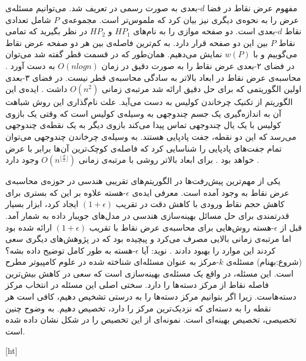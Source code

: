 مفهوم عرض نقاط در فضا $d$-بعدی به صورت رسمی در  تعریف شد. می‌توانیم مسئله‌ی عرض را به نحوه‌ی دیگری نیز بیان کرد که ملموس‌تر است.
 مجموعه‌ی $P$ شامل تعدادی نقاط $d$-بعدی است. دو صفحه موازی را به نام‌های $HP_1$ و $HP_2$ در نظر بگیرید که تمامی نقاط $P$ بین این دو صفحه قرار دارد. به کم‌ترین فاصله‌ی بین هر دو صفحه عرض نقاط می‌گوییم و با $w(P)$ نمایش می‌دهیم.
  همان‌طور که در قسمت قطر گفته شد می‌توان در فضای ۲-بعدی عرض نقاط را به صورت دقیق در زمان $O(n log n)$ به دست آورد . محاسبه‌ی عرض نقاط در ابعاد بالاتر به سادگی محاسبه‌ی قطر نیست. در فضای ۳-بعدی اولین الگوریتمی که برای حل دقیق ارائه شد مرتبه‌ی زمانی $O(n^2)$ داشت . ایده‌ی این الگوریتم از تکنیک چرخاندن کولیس  به دست می‌آید. علت نام‌گذاری این روش شباهت آن به اندازه‌گیری یک جسم چندوجهی به وسیله‌ی کولیس است که وقتی یک بازوی کولیس با یک یال چندوجهی تماس پیدا می‌کند بازوی دیگر به یک نقطه‌ی چندوجهی می‌رسد که این دو نقطه، جفت پادپایی  هستند. به وسیله‌ی چرخاندن چندوجهی می‌توان تمام جفت‌های پادپایی را شناسایی کرد که فاصله‌ی کوچک‌ترین آن‌ها برابر با عرض خواهد بود . برای ابعاد بالاتر روشی با مرتبه‌ی زمانی
   $O(n^{\lfloor \frac{d}{2} \rfloor})$
وجود دارد .

یکی از مهم‌ترین پیش‌رفت‌ها در الگوریتم‌های تقریبی هندسی در حوزه‌ی محاسبه‌ی عرض نقاط به وجود آمده است. معرفی ایده‌ی $\epsilon$-هسته علاوه بر این که بستری برای کاهش حجم نقاط ورودی با کاهش دقت در تقریب $(1+ \epsilon)$ ایجاد کرد، ابزار بسیار قدرتمندی برای حل مسائل بهینه‌سازی هندسی در مدل‌های جویبار داده به شمار آمد. قبل از $\epsilon$-هسته روش‌هایی برای محاسبه‌ی عرض نقاط با تقریب  $(1+ \epsilon)$  ارائه شده بود  اما مرتبه‌ی زمانی بالایی مصرف می‌کرد و پیچیده بود که در پژوهش‌های دیگری سعی کردند این موارد را بهبود دادند . 
نوید: آيا $\epsilon$-هسته به طور کامل توضیح داده بشه؟
(شروع:بهنام)
مسئله‌ی $k$-مرکز به عنوان مسئله‌ای شناخته شده در علوم کامپیوتر مطرح است.
این مسئله، در واقع یک مسئله‌ی بهینه‌سازی است که سعی در کاهش بیش‌ترین فاصله نقاط از مرکز دسته‌ها را دارد.
سختی اصلی این مسئله در انتخاب مرکز دسته‌هاست.
زیرا اگر بتوانیم مرکز دسته‌ها را به درستی تشخیص دهیم، کافی است هر نقطه را به دسته‌ای که نزدیک‌ترین مرکز را دارد، تخصیص دهیم.
به وضوح چنین تخصیصی، تخصیص بهینه‌ای است.
نمونه‌ای از این تخصیص را در شکل  نشان داده شده است.

[ht]

